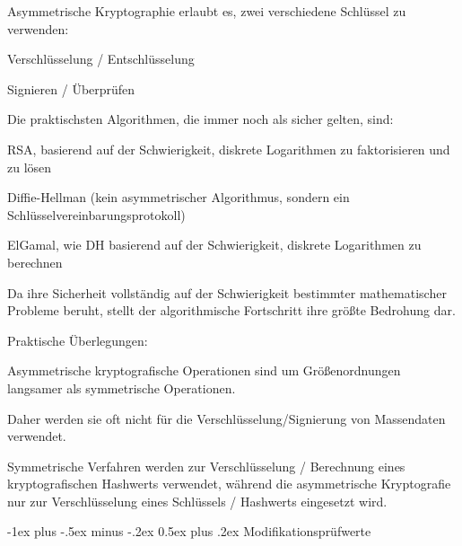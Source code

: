 \documentclass[a4paper]{article}
\makeatletter
\renewcommand{\section}{\@startsection{section}{1}{0mm}%
 {-1ex plus -.5ex minus -.2ex}%
 {0.5ex plus .2ex}%
 {\normalfont\large\bfseries}}
\makeatother
\begin{document}
\begin{multicols}{3}
      \begin{itemize*}
            \item Asymmetrische Kryptographie erlaubt es, zwei verschiedene Schlüssel zu
            verwenden:
            \begin{itemize*}
                  \item Verschlüsselung / Entschlüsselung
                  \item Signieren / Überprüfen
            \end{itemize*}
            \item Die praktischsten Algorithmen, die immer noch als sicher gelten, sind:
            \begin{itemize*}
                  \item RSA, basierend auf der Schwierigkeit, diskrete Logarithmen zu faktorisieren und zu lösen
                  \item Diffie-Hellman (kein asymmetrischer Algorithmus, sondern ein Schlüsselvereinbarungsprotokoll)
                  \item ElGamal, wie DH basierend auf der Schwierigkeit, diskrete Logarithmen zu berechnen
            \end{itemize*}
            \item Da ihre Sicherheit vollständig auf der Schwierigkeit bestimmter
            mathematischer Probleme beruht, stellt der algorithmische Fortschritt
            ihre größte Bedrohung dar.
            \item Praktische Überlegungen:
            \begin{itemize*}
                  \item Asymmetrische kryptografische Operationen sind um Größenordnungen langsamer als symmetrische Operationen.
                  \item Daher werden sie oft nicht für die Verschlüsselung/Signierung von Massendaten verwendet.
                  \item Symmetrische Verfahren werden zur Verschlüsselung / Berechnung eines kryptografischen Hashwerts verwendet, während die asymmetrische Kryptografie nur zur Verschlüsselung eines Schlüssels / Hashwerts eingesetzt wird.
            \end{itemize*}
      \end{itemize*}


      \section{Modifikationsprüfwerte}



\end{multicols}
\end{document}
